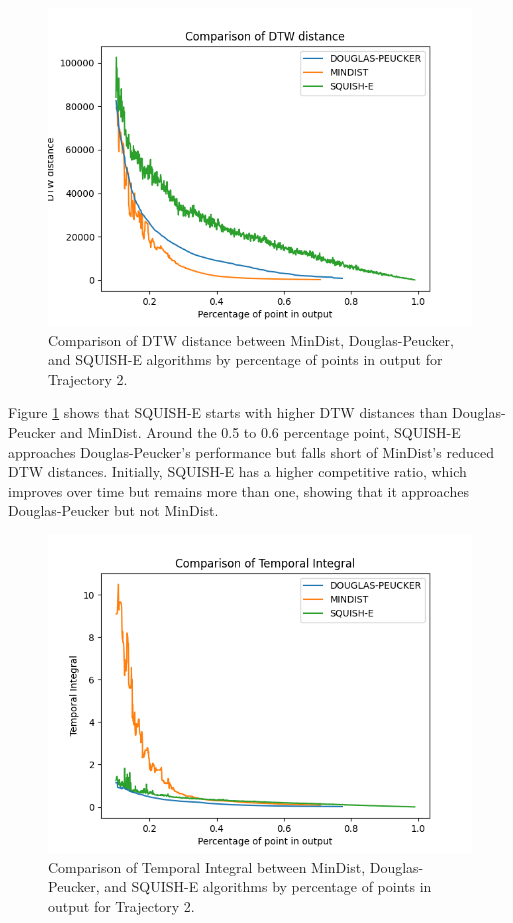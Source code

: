\begin{figure}
	\centering
	\includegraphics[width=0.9\linewidth]{figures/Stats/dtimewarp_comp2.png}
	\caption{Comparison of DTW distance between MinDist, Douglas-Peucker, and SQUISH-E algorithms by percentage of points in output  for Trajectory 2.}
	\label{fig:comp_dt2}
\end{figure}

Figure \ref{fig:comp_dt2} shows that SQUISH-E starts with higher DTW distances than Douglas-Peucker and MinDist. Around the 0.5 to 0.6 percentage point, SQUISH-E approaches Douglas-Peucker's performance but falls short of MinDist's reduced DTW distances. Initially, SQUISH-E has a higher competitive ratio, which improves over time but remains more than one, showing that it approaches Douglas-Peucker but not MinDist. \\

\begin{figure}
	\centering
	\includegraphics[width=0.9\linewidth]{figures/Stats/atemp_comp2.png}
	\caption{Comparison of Temporal Integral between MinDist, Douglas-Peucker, and SQUISH-E algorithms by percentage of points in output  for Trajectory 2.}
	\label{fig:comp_at2}
\end{figure}

